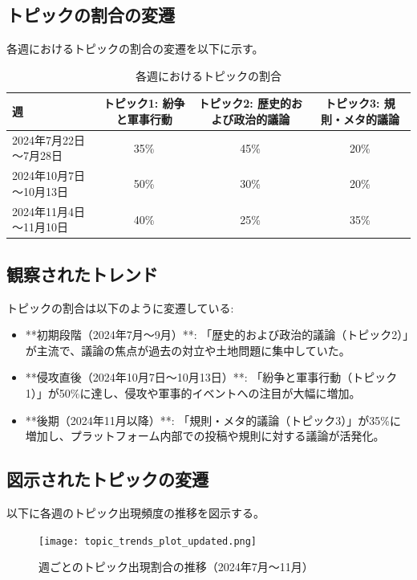\documentclass[11pt, a4j]{jreport}
\begin{document}
    \subsection*{トピックの割合の変遷}
    各週におけるトピックの割合の変遷を以下に示す。

    \begin{table}[H]
    \centering
    \caption{各週におけるトピックの割合}
    \begin{tabular}{|l|c|c|c|}
        \hline
        週 & トピック1: 紛争と軍事行動 & トピック2: 歴史的および政治的議論 & トピック3: 規則・メタ的議論 \\
        \hline
        2024年7月22日～7月28日 & 35\% & 45\% & 20\% \\
        2024年10月7日～10月13日 & 50\% & 30\% & 20\% \\
        2024年11月4日～11月10日 & 40\% & 25\% & 35\% \\
        \hline
    \end{tabular}
    \label{tab:topic_ratios}
    \end{table}

    \subsection*{観察されたトレンド}
    トピックの割合は以下のように変遷している:
    \begin{itemize}
        \item **初期段階（2024年7月～9月）**: 「歴史的および政治的議論（トピック2）」が主流で、議論の焦点が過去の対立や土地問題に集中していた。
        \item **侵攻直後（2024年10月7日～10月13日）**: 「紛争と軍事行動（トピック1）」が50\%に達し、侵攻や軍事的イベントへの注目が大幅に増加。
        \item **後期（2024年11月以降）**: 「規則・メタ的議論（トピック3）」が35\%に増加し、プラットフォーム内部での投稿や規則に対する議論が活発化。
    \end{itemize}

    \subsection*{図示されたトピックの変遷}
    以下に各週のトピック出現頻度の推移を図示する。

    \begin{figure}[H]
        \centering
        \texttt{[image: topic\_trends\_plot\_updated.png]}
        \caption{週ごとのトピック出現割合の推移（2024年7月～11月）}
        \label{fig:topic_trends}
    \end{figure}
\end{document}
